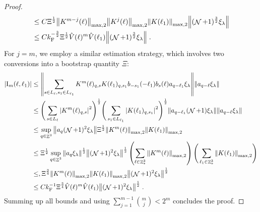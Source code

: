\documentclass[12pt,a4paper]{article}
\numberwithin{equation}{section}
\newcommand{\1}{\mathbb{I}}
\newcommand{\F}{\mathrm{F}}
\newcommand{\I}{\mathrm{I}}
\DeclareMathOperator{\Z}{\mathbb{Z}}
\DeclareMathOperator{\NN}{\mathcal{N}}
\newcommand{\half}{\frac{1}{2}}
\theoremstyle{plain}
\theoremstyle{definition}
\theoremstyle{remark}
\theoremstyle{plain}
\theoremstyle{definition}
\theoremstyle{remark}
\begin{document}
\begin{proof}
\begin{align}
	&\leq C\Xi^\half
		\norm{K^{m-j}(\ell)}_{ \mathrm{max,2} } \norm{K^{j}(\ell)}_{\mathrm{max,2}}
		\norm{  K(\ell_1)}_{\mathrm{max,2}}
		\norm{(\NN+1)^\frac{3}{2} \xi_\lambda} \nonumber \\
	&\leq C k_{\F}^{-\frac{3}{2}}\Xi^\half 
		\hat{V}(\ell)^{m}
		\hat{V}(\ell_1)
		\norm{(\NN+1)^\frac{3}{2} \xi_\lambda} \;. \label{eq:estEQ1112}
\end{align}
For $ j = m $, we employ a similar estimation strategy, which involves two conversions into a bootstrap quantity $ \Xi $:
\begin{align}
	|\I_m(\ell, \ell_1)|
	&\leq \norm{ \sum\limits_{s\in L_{\ell}, s_1 \in L_{\ell_1}} K^m(\ell)_{q,s}K(\ell_1)_{q,s_1} b_{-s_1}(-\ell_1) b_{s}(\ell) a_{q-\ell_1}\xi_\lambda}\norm{ a_{q-\ell}\xi_\lambda }\nonumber\\
	&\leq \Bigg(\sum\limits_{s \in L_{\ell}} \abs{K^m(\ell)_{q,s}}^2\Bigg)^\half \Bigg(\sum\limits_{s_1 \in L_{\ell_1}} \abs{K(\ell_1)_{q,s_1}}^2\Bigg)^\half \norm{ a_{q-\ell_1} (\NN+1)\xi_\lambda} \norm{ a_{q-\ell}\xi_\lambda }\nonumber\\
	&\leq \sup_{q \in \Z^3}\norm{ a_{q} (\NN+1)^2\xi_\lambda}\Xi^\half
		\norm{K^{m}(\ell)}_{\mathrm{max,2}}  
		\norm{K(\ell_1)}_{\mathrm{max,2}} \nonumber\\
	&\leq \Xi^\half \sup_{q \in \Z^3}\norm{ a_{q} \xi_\lambda}^\half \norm{ (\NN+1)^2\xi_\lambda}^\half \left(\sum\limits_{\ell \in \Z^3_*} \norm{K^m(\ell)}_{\mathrm{max,2}}\right)\Bigg(\sum\limits_{\ell_1 \in \Z^3_*} \norm{K(\ell_1)}_{\mathrm{max,2}}\Bigg) \nonumber\\
	&\leq ,\Xi^{\frac{3}{4}}
		\norm{K^m(\ell)}_{\mathrm{max,2}}
		\norm{K(\ell_1)}_{\mathrm{max,2}}
		\norm{(\NN+1)^2\xi_\lambda}^\half \nonumber \\
	&\leq C k_{\F}^{-1}\Xi^{\frac{3}{4}} 
		\hat{V}(\ell)^m
		\hat{V}(\ell_1)
		\norm{ (\NN+1)^2\xi_\lambda}^\half \;.
\end{align}
Summing up all bounds and using $\sum_{j=1}^{m-1} {{m}\choose j} < 2^m $ concludes the proof.
\end{proof}
\end{document}
